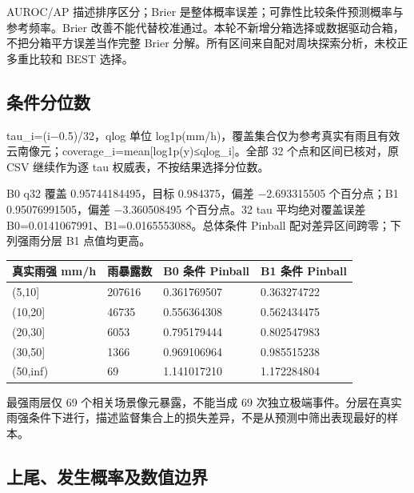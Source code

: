 \documentclass[UTF8,a4paper,10pt,fontset=fandol]{ctexart}
\begin{document}
AUROC/AP 描述排序区分；Brier 是整体概率误差；可靠性比较条件预测概率与参考频率。Brier 改善不能代替校准通过。本轮不新增分箱选择或数据驱动合箱，不把分箱平方误差当作完整 Brier 分解。所有区间来自配对周块探索分析，未校正多重比较和 BEST 选择。\par

\subsection*{条件分位数}

tau\_i=(i−0.5)/32，qlog 单位 log1p(mm/h)，覆盖集合仅为参考真实有雨且有效云南像元；coverage\_i=mean[log1p(y)≤qlog\_i]。全部 32 个点和区间已核对，原 CSV 继续作为逐 tau 权威表，不按结果选择分位数。\par

B0 q32 覆盖 0.95744184495，目标 0.984375，偏差 −2.693315505 个百分点；B1 0.95076991505，偏差 −3.360508495 个百分点。32 tau 平均绝对覆盖误差 B0=0.0141067991、B1=0.0165553088。总体条件 Pinball 配对差异区间跨零；下列强雨分层 B1 点值均更高。\par

\begin{center}\scriptsize\begin{longtable}{@{}p{}p{}p{}p{}@{}}\toprule
真实雨强 mm/h & 雨暴露数 & B0 条件 Pinball & B1 条件 Pinball\\
\midrule\endhead
(5,10] & 207616 & 0.361769507 & 0.363274722\\
(10,20] & 46735 & 0.556364308 & 0.562434475\\
(20,30] & 6053 & 0.795179444 & 0.802547983\\
(30,50] & 1366 & 0.969106964 & 0.985515238\\
(50,inf) & 69 & 1.141017210 & 1.172284804\\
\bottomrule\end{longtable}\end{center}\normalsize

最强雨层仅 69 个相关场景像元暴露，不能当成 69 次独立极端事件。分层在真实雨强条件下进行，描述监督集合上的损失差异，不是从预测中筛出表现最好的样本。\par

\subsection*{上尾、发生概率及数值边界}
\end{document}
